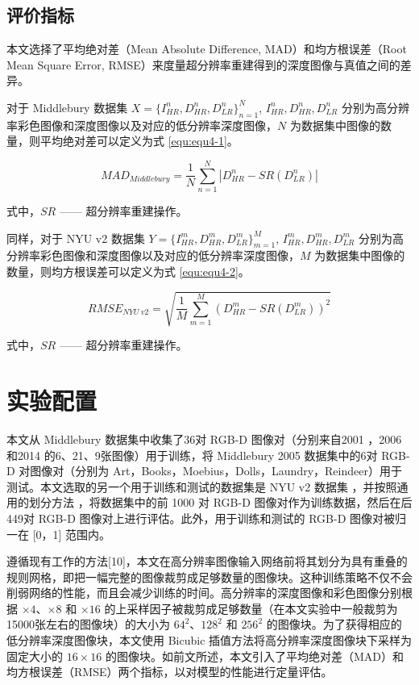 \subsection{评价指标}

本文选择了平均绝对差（Mean Absolute Difference, MAD）和均方根误差（Root Mean Square Error, RMSE）来度量超分辨率重建得到的深度图像与真值之间的差异。

对于 Middlebury 数据集 $X=\{I_{HR}^n,D_{HR}^n,D_{LR}^n\}_{n=1}^N$, $I_{HR}^n,D_{HR}^n,D_{LR}^n$ 分别为高分辨率彩色图像和深度图像以及对应的低分辨率深度图像，$N$ 为数据集中图像的数量，则平均绝对差可以定义为式 \ref{equ:equ4-1}。

\begin{equation}
	MAD_{Middlebury}=\frac{1}{N}\sum_{n=1}^{N}\left|D_{HR}^n-SR\left(D_{LR}^n\right)\right|
	\label{equ:equ4-1}
\end{equation}

\noindent 式中，$SR$ —— 超分辨率重建操作。

同样，对于 NYU v2 数据集 $Y=\{I_{HR}^m,D_{HR}^m,D_{LR}^m\}_{m=1}^M$, $I_{HR}^m,D_{HR}^m,D_{LR}^m$ 分别为高分辨率彩色图像和深度图像以及对应的低分辨率深度图像，$M$ 为数据集中图像的数量，则均方根误差可以定义为式 \ref{equ:equ4-2}。

\begin{equation}
	{RMSE}_{NYU\ v2}=\sqrt{\frac{1}{M}\sum_{m=1}^{M}\left(D_{HR}^m-SR\left(D_{LR}^m\right)\right)^2}
	\label{equ:equ4-2}
\end{equation}

\noindent 式中，$SR$ —— 超分辨率重建操作。

\section{实验配置}

本文从 Middlebury 数据集中收集了36对 RGB-D 图像对（分别来自2001 \cite{DBLP:journals/ijcv/BakerSLRBS11}，2006 \cite{DBLP:conf/cvpr/HirschmullerS07} 和2014 \cite{DBLP:conf/dagm/ScharsteinHKKNWW14} 的6、21、9张图像）用于训练，将 Middlebury 2005 \cite{DBLP:conf/cvpr/ScharsteinP07} 数据集中的6对 RGB-D 对图像对（分别为 Art，Books，Moebius，Dolls，Laundry，Reindeer）用于测试。本文选取的另一个用于训练和测试的数据集是 NYU v2 数据集 \cite{SilbermanHKF12}，并按照通用的划分方法 \cite{DBLP:conf/eccv/LiHA016}，将数据集中的前 1000 对 RGB-D 图像对作为训练数据，然后在后449对 RGB-D 图像对上进行评估。此外，用于训练和测试的 RGB-D 图像对被归一在 [0，1] 范围内。

遵循现有工作的方法[10]，本文在高分辨率图像输入网络前将其划分为具有重叠的规则网格，即把一幅完整的图像裁剪成足够数量的图像块。这种训练策略不仅不会削弱网络的性能，而且会减少训练的时间。高分辨率的深度图像和彩色图像分别根据 $\times 4$、$\times 8$ 和 $\times 16$ 的上采样因子被裁剪成足够数量（在本文实验中一般裁剪为15000张左右的图像块）的大小为 ${64}^2$、${128}^2$ 和 ${256}^2$ 的图像块。为了获得相应的低分辨率深度图像块，本文使用 Bicubic 插值方法将高分辨率深度图像块下采样为固定大小的 $16 \times 16$ 的图像块。如前文所述，本文引入了平均绝对差（MAD）和均方根误差（RMSE）两个指标，以对模型的性能进行定量评估。

